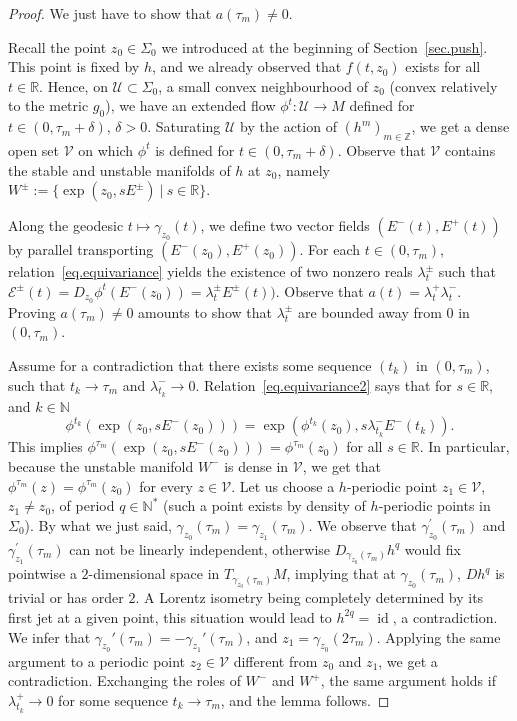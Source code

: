 \documentclass[11pt]{article}
\theoremstyle{definition}
\numberwithin{equation}{section}
\numberwithin{figure}{section}
\numberwithin{table}{section}
\DeclareMathOperator{\id}{id}
\newcommand*\NN{\mathbb{N}}
\newcommand*\RR{\mathbb{R}}
\newcommand*\ZZ{\mathbb{Z}}
\begin{document}
\begin{proof}
We just have to show that $a(\tau_m) \not =0$.

Recall the point $z_0 \in {\Sigma}_0$ we introduced at the beginning of Section~\ref{sec.push}. This point is fixed by $h$, and we already observed that $f(t,z_0)$ exists for all $t \in \RR$. Hence, on ${\mathcal U} \subset {\Sigma}_0$, a small convex neighbourhood of $z_0$ (convex relatively to the metric $g_0$), we have an extended flow $\phi^t: {\mathcal U} \to M$ defined for $t \in (0,\tau_m+\delta)$, $\delta>0$. Saturating ${\mathcal U}$ by the action of $(h^m)_{m \in \ZZ}$, we get a dense open set ${\mathcal V}$ on which $\phi^t$ is defined for $t \in (0,\tau_m+\delta)$. Observe that ${\mathcal V}$ contains the stable and unstable manifolds of $h$ at $z_0$, namely $W^{\pm}:=\{ \exp(z_0,sE^{\pm}) \ | \ s \in \RR \}.$

Along the geodesic $t \mapsto \gamma_{z_0}(t)$, we define two vector fields $(E^-(t),E^+(t))$ by parallel transporting $(E^-(z_0),E^+(z_0))$. For each $t \in (0,\tau_m)$, relation~\eqref{eq.equivariance} yields the existence of two nonzero reals $\lambda_t^{\pm}$ such that ${\mathcal E}^{\pm}(t)=D_{z_0}\phi^t(E^-(z_0))=\lambda_t^{\pm}E^{\pm}(t))$. Observe that ${a}(t)=\lambda_t^+ \lambda_t^-$. Proving $a(\tau_m) \not =0$ amounts to show that $\lambda_t^{\pm}$ are bounded away from $0$ in $(0,\tau_m)$.

Assume for a contradiction that there exists some sequence $(t_k)$ in $(0,\tau_m)$, such that $t_k \to \tau_m$ and $\lambda_{t_k}^- \to 0$. Relation~\eqref{eq.equivariance2} says that for $s \in \RR$, and $k \in \NN$
\[
\phi^{t_k}(\exp(z_0,sE^{-}(z_0)))=\exp(\phi^{t_k}(z_0),s\lambda_{t_k}^-E^-(t_k)).
\]
This implies $\phi^{\tau_m}(\exp(z_0,sE^-(z_0)))=\phi^{\tau_m}(z_0)$ for all $s \in \RR$. In particular, because the unstable manifold $W^-$ is dense in ${\mathcal V}$, we get that $\phi^{\tau_m}(z)=\phi^{\tau_m}(z_0)$ for every $z \in {\mathcal V}$. Let us choose a $h$-periodic point $z_1 \in {\mathcal V}$, $z_1 \not = z_0$, of period $q \in \NN^*$ (such a point exists by density of $h$-periodic points in $\Sigma_0$). By what we just said, $\gamma_{z_0}(\tau_m)=\gamma_{z_1}(\tau_m)$. We observe that $\gamma_{z_0}^{\prime}(\tau_m)$ and $\gamma_{z_1}^{\prime}(\tau_m)$ can not be linearly independent, otherwise $D_{\gamma_{z_0}(\tau_m)}h^q$ would fix pointwise a $2$-dimensional space in $T_{\gamma_{z_0}(\tau_m)}M$, implying that at $\gamma_{z_0}(\tau_m)$, $Dh^q$ is trivial or has order $2$. A Lorentz isometry being completely determined by its first jet at a given point, this situation would lead to $h^{2q}=\id$, a contradiction. We infer that $\gamma_{z_0}'(\tau_m)=-\gamma_{z_1}'(\tau_m)$, and $z_1=\gamma_{z_0}(2 \tau_m)$. Applying the same argument to a periodic point $z_2 \in {\mathcal V}$ different from $z_0$ and $z_1$, we get a contradiction. Exchanging the roles of $W^-$ and $W^+$, the same argument holds if $\lambda_{t_k}^+ \to 0$ for some sequence $t_k \to \tau_m$, and the lemma follows.
\end{proof}
\end{document}
